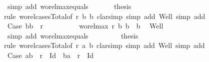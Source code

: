 \begin{isabellebody}
\ {\isacharparenleft}{\kern0pt}simp\ add{\isacharcolon}{\kern0pt}\ wo{\isacharunderscore}{\kern0pt}rel{\isachardot}{\kern0pt}max{}{\isacharunderscore}{\kern0pt}equals{}{\isacharparenright}{\kern0pt}\isanewline
\ \ \ \ \ \isamarkupfalse%
\ {\isacharquery}{\kern0pt}thesis\isanewline
\ \ \ \ \ \isamarkupfalse%
{\isacharparenleft}{\kern0pt}rule\ wo{\isacharunderscore}{\kern0pt}rel{\isachardot}{\kern0pt}cases{\isacharunderscore}{\kern0pt}Total{\isacharbrackleft}{\kern0pt}of\ r\ b{}\ b{}{\isacharbrackright}{\kern0pt}{\isacharcomma}{\kern0pt}\ clarsimp\ simp\ add{\isacharcolon}{\kern0pt}\ Well{\isacharcomma}{\kern0pt}\ simp\ add{\isacharcolon}{\kern0pt}\ {}{\isacharparenright}{\kern0pt}\isanewline
\ \ \ \ \ \ \ \isamarkupfalse%
\ Case{}{}{\isacharcolon}{\kern0pt}\ {\isachardoublequoteopen}{\isacharparenleft}{\kern0pt}b{}{\isacharcomma}{\kern0pt}b{}{\isacharparenright}{\kern0pt}\ {\isasymin}\ r{\isachardoublequoteclose}\isanewline
\ \ \ \ \ \ \ \isamarkupfalse%
\ {}{\isacharcolon}{\kern0pt}\ {\isachardoublequoteopen}wo{\isacharunderscore}{\kern0pt}rel{\isachardot}{\kern0pt}max{}\ r\ b{}\ b{}\ {\isacharequal}{\kern0pt}\ b{}{\isachardoublequoteclose}\ \isamarkupfalse%
\ Well\ {}\ \isamarkupfalse%
\ {\isacharparenleft}{\kern0pt}simp\ add{\isacharcolon}{\kern0pt}\ wo{\isacharunderscore}{\kern0pt}rel{\isachardot}{\kern0pt}max{}{\isacharunderscore}{\kern0pt}equals{}{\isacharparenright}{\kern0pt}\isanewline
\ \ \ \ \ \ \ \isamarkupfalse%
\ {\isacharquery}{\kern0pt}thesis\isanewline
\ \ \ \ \ \ \ \isamarkupfalse%
{\isacharparenleft}{\kern0pt}rule\ wo{\isacharunderscore}{\kern0pt}rel{\isachardot}{\kern0pt}cases{\isacharunderscore}{\kern0pt}Total{}{\isacharbrackleft}{\kern0pt}of\ r\ a{}\ b{}{\isacharbrackright}{\kern0pt}{\isacharcomma}{\kern0pt}\ clarsimp\ simp\ add{\isacharcolon}{\kern0pt}\ Well{\isacharcomma}{\kern0pt}\ simp\ add{\isacharcolon}{\kern0pt}\ {}{\isacharparenright}{\kern0pt}\isanewline
\ \ \ \ \ \ \ \ \ \isamarkupfalse%
\ Case{}{}{}{\isacharcolon}{\kern0pt}\ {\isachardoublequoteopen}{\isacharparenleft}{\kern0pt}a{}{\isacharcomma}{\kern0pt}b{}{\isacharparenright}{\kern0pt}\ {\isasymin}\ r\ {\isacharminus}{\kern0pt}\ Id\ {\isasymor}\ {\isacharparenleft}{\kern0pt}b{}{\isacharcomma}{\kern0pt}a{}{\isacharparenright}{\kern0pt}\ {\isasymin}\ r\ {\isacharminus}{\kern0pt}\ Id{\isachardoublequoteclose}\isanewline

\end{isabellebody}
